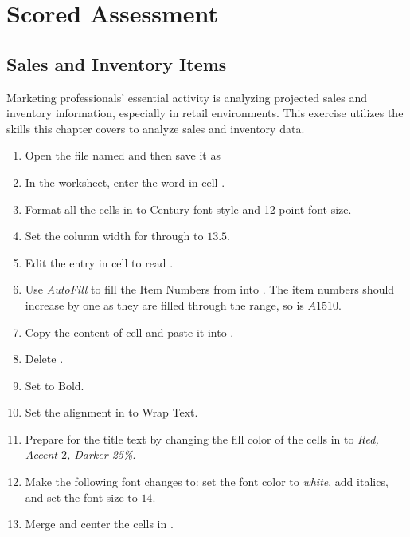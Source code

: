 \section{Scored Assessment}

\subsection{Sales and Inventory Items}

Marketing professionals' essential activity is analyzing projected sales and inventory information, especially in retail environments. This exercise utilizes the skills this chapter covers to analyze sales and inventory data.

\begin{enumbox}
	\begin{enumerate}
		\item Open the file named  and then save it as 
		\item In the  worksheet, enter the word  in cell .
		\item Format all the cells in  to Century font style and 12-point font size.
		\item Set the column width for  through  to $ 13.5 $.
		\item Edit the entry in cell  to read .
		\item Use \textit{AutoFill} to fill the Item Numbers from  into . The item numbers should increase by one as they are filled through the range, so  is $ A1510 $.
		\item Copy the content of cell  and paste it into .
		\item Delete .
		\item Set  to Bold.
		\item Set the alignment in  to Wrap Text.
		\item Prepare  for the title text by changing the fill color of the cells in  to \textit{Red, Accent $ 2 $, Darker 25\%}.
		\item Make the following font changes to: set the font color to \textit{white}, add italics, and set the font size to $ 14 $.
		\item Merge and center the cells in .

\end{enumerate}
\end{enumbox}

